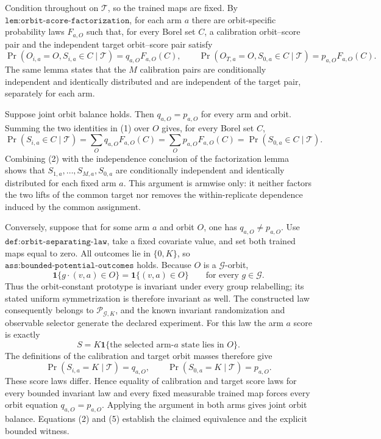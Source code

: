 Condition throughout on \(\mathcal T\), so the trained maps are fixed. By \(\texttt{lem:orbit-score-factorization}\), for each arm \(a\) there are orbit-specific probability laws \(F_{a,O}\) such that, for every Borel set \(C\), a calibration orbit--score pair and the independent target orbit--score pair satisfy
\[
\Pr(O_{i,a}=O,S_{i,a}\in C\mid\mathcal T)=q_{a,O}F_{a,O}(C),\qquad \Pr(O_{T,a}=O,S_{0,a}\in C\mid\mathcal T)=p_{a,O}F_{a,O}(C).
\tag{1}
\]
The same lemma states that the \(M\) calibration pairs are conditionally independent and identically distributed and are independent of the target pair, separately for each arm.

Suppose joint orbit balance holds. Then \(q_{a,O}=p_{a,O}\) for every arm and orbit. Summing the two identities in (1) over \(O\) gives, for every Borel set \(C\),
\[
\Pr(S_{i,a}\in C\mid\mathcal T)=\sum_Oq_{a,O}F_{a,O}(C)=\sum_Op_{a,O}F_{a,O}(C)=\Pr(S_{0,a}\in C\mid\mathcal T).
\tag{2}
\]
Combining (2) with the independence conclusion of the factorization lemma shows that \(S_{1,a},\ldots,S_{M,a},S_{0,a}\) are conditionally independent and identically distributed for each fixed arm \(a\). This argument is armwise only: it neither factors the two lifts of the common target nor removes the within-replicate dependence induced by the common assignment.

Conversely, suppose that for some arm \(a\) and orbit \(O\), one has \(q_{a,O}\ne p_{a,O}\). Use \(\texttt{def:orbit-separating-law}\), take a fixed covariate value, and set both trained maps equal to zero. All outcomes lie in \(\{0,K\}\), so \(\texttt{ass:bounded-potential-outcomes}\) holds. Because \(O\) is a \(\mathcal G\)-orbit,
\[
\mathbf 1\{g\cdot(v,a)\in O\}=\mathbf 1\{(v,a)\in O\}\qquad\text{for every }g\in\mathcal G.
\tag{3}
\]
Thus the orbit-constant prototype is invariant under every group relabelling; its stated uniform symmetrization is therefore invariant as well. The constructed law consequently belongs to \(\mathcal P_{\mathcal G,K}\), and the known invariant randomization and observable selector generate the declared experiment. For this law the arm \(a\) score is exactly
\[
S=K\mathbf 1\{\text{the selected arm-}a\text{ state lies in }O\}.
\tag{4}
\]
The definitions of the calibration and target orbit masses therefore give
\[
\Pr(S_{i,a}=K\mid\mathcal T)=q_{a,O},\qquad \Pr(S_{0,a}=K\mid\mathcal T)=p_{a,O}.
\tag{5}
\]
These score laws differ. Hence equality of calibration and target score laws for every bounded invariant law and every fixed measurable trained map forces every orbit equation \(q_{a,O}=p_{a,O}\). Applying the argument in both arms gives joint orbit balance. Equations (2) and (5) establish the claimed equivalence and the explicit bounded witness.